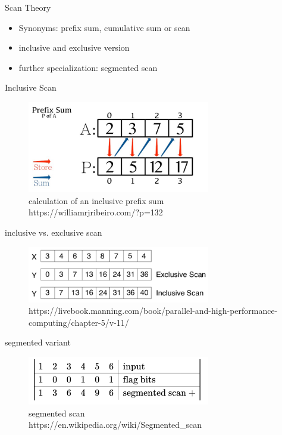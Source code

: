 \begin{frame}{Scan Theory}
	\begin{itemize}
		\item Synonyms: prefix sum, cumulative sum or scan
		\item inclusive and exclusive version
		\item further specialization: segmented scan
	\end{itemize}
\end{frame} 
\begin{frame}{Inclusive Scan}
	\begin{figure}
		\includegraphics[width=80mm]{wiki/prefix-sum.jpg}
		\caption{{calculation of an inclusive prefix sum\\ \tiny https://williamrjribeiro.com/?p=132}}
	\end{figure}
\end{frame}
\begin{frame}{inclusive vs. exclusive scan}
	\begin{figure}
		\includegraphics[width=80mm]{wiki/scans.png}
		\caption{{\tiny https://livebook.manning.com/book/parallel-and-high-performance-computing/chapter-5/v-11/}}
	\end{figure}
\end{frame}
\begin{frame}{segmented variant}
	\begin{figure}
		\includegraphics[width=80mm]{wiki/SegmentedScan.png}
		\caption{{segmented scan \\ \tiny https://en.wikipedia.org/wiki/Segmented\_scan}}
	\end{figure}
\end{frame}

